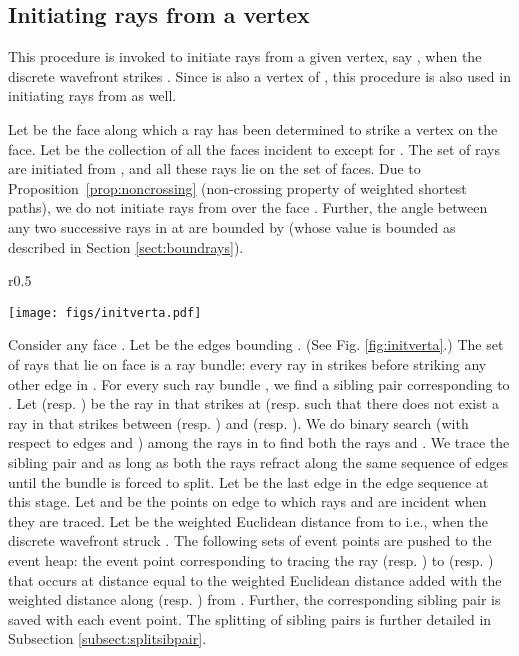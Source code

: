 \documentclass[11pt]{article}
\begin{document}
\subsection{Initiating rays from a vertex}
\label{subsect:initraysvert}

This procedure is invoked to initiate rays from a given vertex, say , when the discrete wavefront strikes .
Since  is also a vertex of , this procedure is also used in initiating rays from  as well. 

Let  be the face along which a ray has been determined to strike a vertex  on the face.
Let  be the collection of all the faces incident to  except for .
The set  of rays are initiated from , and all these rays lie on the set  of faces.
Due to Proposition~\ref{prop:noncrossing} (non-crossing property of weighted shortest paths), we do not initiate rays from  over the face . 
Further, the angle between any two successive rays in  at   are bounded by  (whose value is bounded as described in Section \ref{sect:boundrays}).

\begin{wrapfigure}{r}{0.5\textwidth}
\begin{minipage}[t]{\linewidth}
\begin{center}
\texttt{[image: figs/initverta.pdf]}
\caption{\footnotesize Illustrating successive rays (shown in blue color) striking  from  and a ray bundle being initiated on a face ;  is the sibling pair of .  When  along  and/or  along  strike  and  edges respectively, a discrete wavefront is initiated from .}
\label{fig:initverta}
\end{center}
\end{minipage}
\end{wrapfigure}

Consider any face .
Let  be the edges bounding . 
(See Fig. \ref{fig:initverta}.)
The set  of rays that lie on face  is a ray bundle:
every ray in  strikes  before striking any other edge in .
For every such ray bundle , we find a sibling pair corresponding to .
Let  (resp. ) be the ray in  that strikes  at (resp.  such that there does not exist a ray in  that strikes  between  (resp. ) and  (resp. ).
We do binary search (with respect to edges  and ) among the rays in  to find both the rays  and . We trace the sibling pair  and  as long as both the rays refract along the same sequence of edges  until the bundle is forced to split.
Let  be the last edge in the edge sequence  at this stage.
Let  and  be the points on edge  to which rays  and  are incident when they are traced.
Let  be the weighted Euclidean distance from  to  i.e., when the discrete wavefront struck .
The following sets of event points are pushed to the event heap:
the event point corresponding to tracing the ray  (resp. ) to  (resp. ) that occurs at distance equal to the weighted Euclidean distance  added with the weighted distance along  (resp. ) from .
Further, the corresponding sibling pair is saved with each event point.
The splitting of sibling pairs is further detailed in Subsection \ref{subsect:splitsibpair}.
\end{document}
